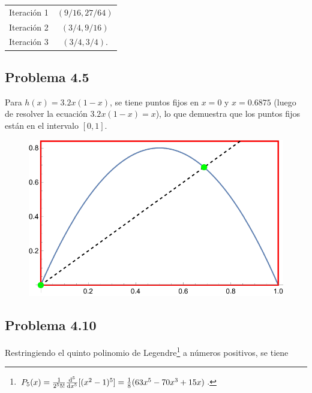 \documentclass[conference]{IEEEtran}
\begin{document}
\begin{table}[H]
	\centering
	\begin{tabular}{cc}
		Iteración 1 & $(9/16,27/64)$ \\
		Iteración 2 & $(3/4,9/16)$ \\
		Iteración 3 & $(3/4,3/4)$.
	\end{tabular}
\end{table}



\subsection{Problema 4.5}
Para $h(x) = 3.2x(1-x)$, se tiene puntos fijos en $x = 0$ y $x = 0.6875$ (luego de resolver la ecuación $3.2x(1-x) = x$), lo que demuestra que los puntos fijos están en el intervalo $[0,1]$.

\begin{figure}[H]
	\centering
	\includegraphics[scale=0.4]{./img/p4-5}
\end{figure}


\subsection{Problema 4.10}
Restringiendo el quinto polinomio de Legendre\footnote{$P_5 (x) = \frac{1}{2^5 5!} \dv[5]{x} [(x^2 - 1)^5] = \frac{1}{8} (63x^5 - 70x^3 + 15x)$.} a números positivos, se tiene
\end{document}
